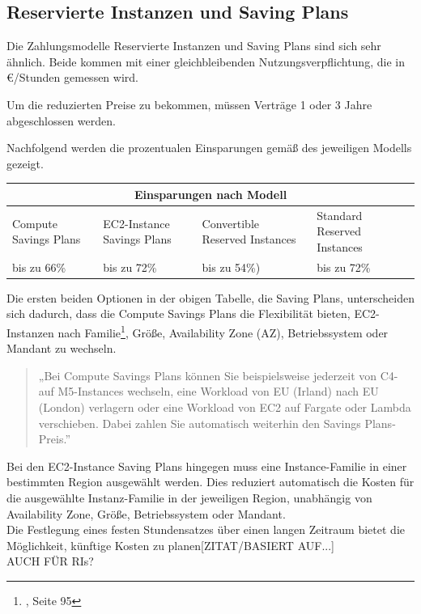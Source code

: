 \subsection{Reservierte Instanzen und Saving Plans}
\begin{flushleft}
    Die Zahlungsmodelle Reservierte Instanzen und Saving Plans sind sich sehr ähnlich. Beide kommen mit einer gleichbleibenden  Nutzungsverpflichtung, die in €/Stunden gemessen wird.

    Um die reduzierten Preise  zu bekommen, müssen Verträge 1 oder 3 Jahre abgeschlossen werden.

    Nachfolgend werden die prozentualen Einsparungen gemäß des jeweiligen Modells gezeigt.
\end{flushleft}

\begin{table}[h!]
    \centering
    \begin{tabular}{ |p{3cm}||p{3cm}|p{3.6cm}|p{3.6cm}|  }
        \hline
        \multicolumn{4}{|c|}{Einsparungen nach Modell}                                                                    \\
        \hline
        Compute Savings Plans & EC2-Instance Savings Plans & Convertible Reserved Instances & Standard Reserved Instances \\
        \hline
        bis zu 66\%           & bis zu 72\%
                              & bis zu 54\%)               & bis zu 72\%
        \\
        \hline
    \end{tabular}
    {\cite{AMZ07,AMZ11}}
\end{table}
Die ersten beiden Optionen in der obigen Tabelle, die Saving Plans, unterscheiden sich dadurch, dass die Compute Savings Plans die Flexibilität bieten, EC2-Instanzen nach Familie\footnote{\cite{AWS1}, Seite 95}, Größe, Availability Zone (AZ), Betriebssystem oder Mandant zu wechseln.
\begin{quote}
    „Bei Compute Savings Plans können Sie beispielsweise jederzeit von C4- auf M5-Instances wechseln, eine Workload von EU (Irland) nach EU (London) verlagern oder eine Workload von EC2 auf Fargate oder Lambda verschieben. Dabei zahlen Sie automatisch weiterhin den Savings Plans-Preis.”
    {\cite{AMZ11}}
\end{quote}

Bei den EC2-Instance Saving Plans hingegen muss eine Instance-Familie in einer bestimmten Region ausgewählt werden.  Dies reduziert automatisch die Kosten für die ausgewählte Instanz-Familie in der jeweiligen Region, unabhängig von Availability Zone, Größe, Betriebssystem oder Mandant.
\\
Die Festlegung eines festen Stundensatzes über einen langen Zeitraum bietet die Möglichkeit, künftige Kosten zu planen[ZITAT/BASIERT AUF...]
\\
AUCH FÜR RIs?
